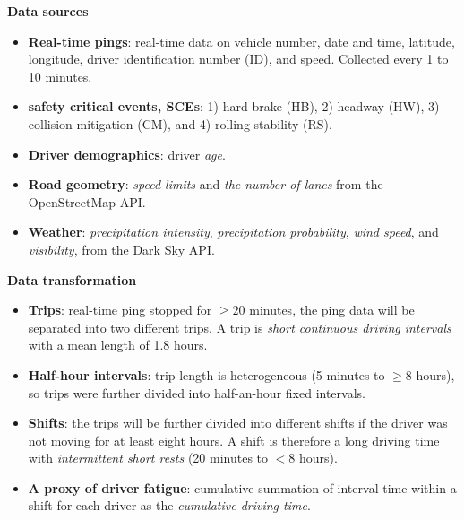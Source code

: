 \begin{frame}{\textbf{Data sources}}
    \begin{itemize}
      \item \textbf{Real-time pings}: real-time data on vehicle number, date and time, latitude, longitude, driver identification number (ID), and speed. Collected every 1 to 10 minutes.
      \item \textbf{safety critical events, SCEs}: 1) hard brake (HB), 2) headway (HW), 3) collision mitigation (CM), and 4) rolling stability (RS).
      \item \textbf{Driver demographics}: driver \textit{age}.
      \item \textbf{Road geometry}: \textit{speed limits} and \textit{the number of lanes} from the OpenStreetMap API.
      \item \textbf{Weather}: \textit{precipitation intensity}, \textit{precipitation probability}, \textit{wind speed}, and \textit{visibility}, from the Dark Sky API.
  \end{itemize}
\end{frame}

\begin{frame}{\textbf{Data transformation}}
    \begin{itemize}
      \item \textbf{Trips}:  real-time ping stopped for $\geq20$ minutes, the ping data will be separated into two different trips. A trip is \textit{short continuous driving intervals} with a mean length of 1.8 hours.
      \item \textbf{Half-hour intervals}: trip length is heterogeneous (5 minutes to $\geq8$ hours),  so trips were further divided into half-an-hour fixed intervals.
      \item \textbf{Shifts}: the trips will be further divided into different shifts if the driver was not moving for at least eight hours. A shift is therefore a long driving time with \textit{intermittent short rests} (20 minutes to $<8$ hours).
      \item \textbf{A proxy of driver fatigue}: cumulative summation of interval time within a shift for each driver as the \textit{cumulative driving time}.
  \end{itemize}
\end{frame}

